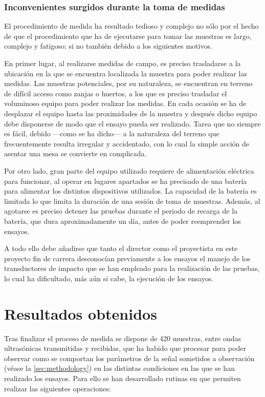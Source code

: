 \subsubsection{Inconvenientes surgidos durante la toma de medidas}

El procedimiento de medida ha resultado tedioso y complejo no sólo por el
hecho de que el procedimiento que ha de ejecutarse para tomar las muestras
es largo, complejo y fatigoso; si no también debido a los siguientes
motivos.

En primer lugar, al realizarse medidas de campo, es preciso trasladarse a
la ubicación en la que se encuentra localizada la muestra para poder
realizar las medidas. Las muestras potenciales, por su naturaleza, se
encuentran en terreno de difícil acceso como zanjas o huertos, a los que es
preciso trasladar el voluminoso equipo para poder realizar las medidas. En
cada ocasión se ha de desplazar el equipo hasta las proximidades de la
muestra y después dicho equipo debe disponerse de modo que el ensayo pueda
ser realizado. Tarea que no siempre es fácil, debido ---como se ha dicho---
a la naturaleza del terreno que frecuentemente resulta irregular y
accidentado, con lo cual la simple acción de asentar una mesa se convierte
en complicada.

Por otro lado, gran parte del equipo utilizado requiere de alimentación
eléctrica para funcionar, al operar en lugares apartados se ha precisado de
una batería para alimentar los distintos dispositivos utilizados. La
capacidad de la batería es limitada lo que limita la duración de una sesión
de toma de muestras. Además, al agotarse es preciso detener las pruebas
durante el periodo de recarga de la batería, que dura aproximadamente un
día, antes de poder reemprender los ensayos.

A todo ello debe añadirse que tanto el director como el proyectista en este
proyecto fin de carrera desconocían previamente a los ensayos el manejo de
los transductores de impacto que se han empleado para la realización de las
pruebas, lo cual ha dificultado, más aún si cabe, la ejecución de los
ensayos.


\section{Resultados obtenidos}

Tras finalizar el proceso de medida se dispone de 420 muestras, entre ondas
ultrasónicas transmitidas y recibidas, que ha habido que procesar para
poder observar como se comportan los parámetros de la señal sometidos a
observación (véase la \vref{sec:methodology}) en las distintas condiciones
en las que se han realizado los ensayos. Para ello se han desarrollado
rutinas en \matlab{} que permiten realizar las siguientes operaciones:

